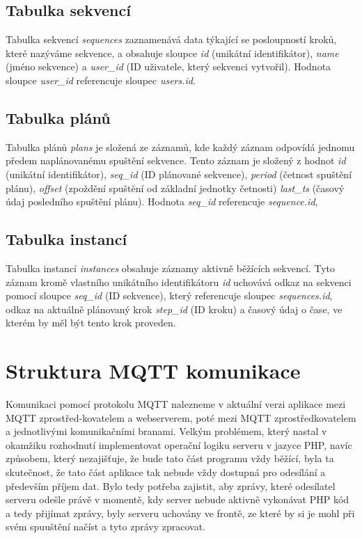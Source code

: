 \subsection{Tabulka sekvencí}

Tabulka sekvencí \emph{sequences} zaznamenává data týkající se posloupností kroků, které nazýváme sekvence, a obsahuje sloupce \emph{id} (unikátní identifikátor), \emph{name} (jméno sekvence) a \emph{user\_id} (ID uživatele, který sekvenci vytvořil). Hodnota sloupce \emph{user\_id} referencuje sloupec \emph{users.id}.

\subsection{Tabulka plánů}

Tabulka plánů \emph{plans} je složená ze záznamů, kde každý záznam odpovídá jednomu předem naplánovanému spuštění sekvence. Tento záznam je složený z hodnot \emph{id} (unikátní identifikátor), \emph{seq\_id} (ID plánované sekvence), \emph{period} (četnost spuštění plánu), \emph{offset} (zpoždění spuštění od základní jednotky četnosti) \emph{last\_ts} (časový údaj posledního spuštění plánu). Hodnota \emph{seq\_id} referencuje \emph{sequence.id}, 

\subsection{Tabulka instancí}

Tabulka instancí \emph{instances} obsahuje záznamy aktivně běžících sekvencí. Tyto záznam kromě vlastního unikátního identifikátoru \emph{id} uchovává odkaz na sekvenci pomocí sloupce \emph{seq\_id} (ID sekvence), který referencuje sloupec \emph{sequences.id}, odkaz na aktuálně plánovaný krok \emph{step\_id} (ID kroku) a časový údaj o čase, ve kterém by měl být tento krok proveden.

\section{Struktura MQTT komunikace}

Komunikaci pomocí protokolu MQTT nalezneme v aktuální verzi aplikace mezi MQTT zprostřed-kovatelem a webserverem, poté mezi MQTT zprostředkovatelem a jednotlivými komunikačními branami. Velkým problémem, který nastal v okamžiku rozhodnutí implementovat operační logiku serveru v jazyce PHP, navíc způsobem, který nezajišťuje, že bude tato část programu vždy běžící, byla ta skutečnost, že tato část aplikace tak nebude vždy dostupná pro odesílání a především příjem dat. Bylo tedy potřeba zajistit, aby zprávy, které odesílatel serveru odešle právě v momentě, kdy server nebude aktivně vykonávat PHP kód a tedy přijímat zprávy, byly serveru uchovány ve frontě, ze které by si je mohl při svém spuuštění načíst a tyto zprávy zpracovat.

